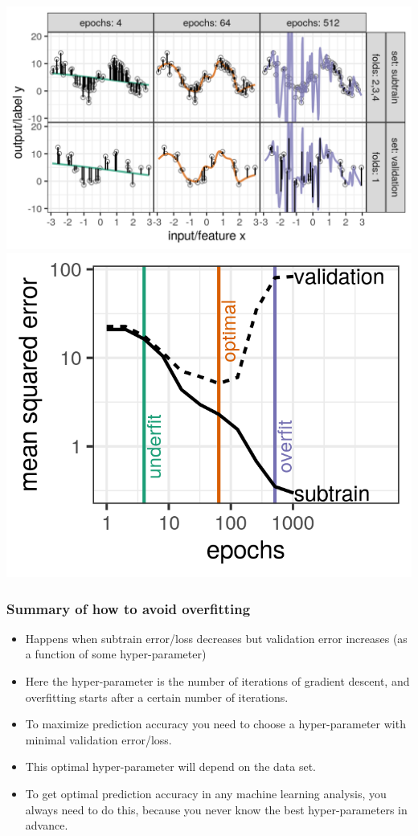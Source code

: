 \documentclass{beamer}
\begin{document}
\begin{frame}
  \centering
  \includegraphics[height=0.5\textheight]{figure-overfitting-paper}
  \includegraphics[height=0.45\textheight]{figure-overfitting-paper-loss}   
\end{frame} 

\begin{frame}
  \frametitle{Summary of how to avoid overfitting}
  \begin{itemize}
  \item Happens when subtrain error/loss decreases but validation error
    increases (as a function of some hyper-parameter)
  \item Here the hyper-parameter is the number of iterations of
    gradient descent, and overfitting starts after a certain number of
    iterations.
  \item To maximize prediction accuracy you need to choose a
    hyper-parameter with minimal validation error/loss.
  \item This optimal hyper-parameter will depend on the data set.
  \item To get optimal prediction accuracy in any machine learning
    analysis, you always need to do this, because you never know the
    best hyper-parameters in advance.
  \end{itemize}
\end{frame}
\end{document}
